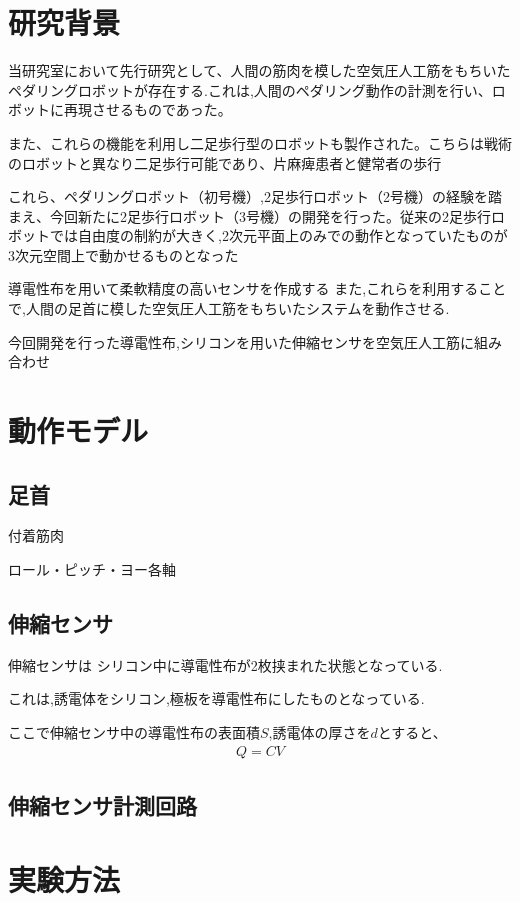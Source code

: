 \section{研究背景}
当研究室において先行研究として、人間の筋肉を模した空気圧人工筋をもちいたペダリングロボットが存在する.これは,人間のペダリング動作の計測を行い、ロボットに再現させるものであった。

また、これらの機能を利用し二足歩行型のロボットも製作された。こちらは戦術のロボットと異なり二足歩行可能であり、片麻痺患者と健常者の歩行

これら、ペダリングロボット（初号機）,2足歩行ロボット（2号機）の経験を踏まえ、今回新たに2足歩行ロボット（3号機）の開発を行った。従来の2足歩行ロボットでは自由度の制約が大きく,2次元平面上のみでの動作となっていたものが3次元空間上で動かせるものとなった

導電性布を用いて柔軟精度の高いセンサを作成する
また,これらを利用することで,人間の足首に模した空気圧人工筋をもちいたシステムを動作させる.

今回開発を行った導電性布,シリコンを用いた伸縮センサを空気圧人工筋に組み合わせ
\section{動作モデル}
\subsection{足首}
付着筋肉

ロール・ピッチ・ヨー各軸
\subsection{伸縮センサ}
伸縮センサは
シリコン中に導電性布が2枚挟まれた状態となっている.

これは,誘電体をシリコン,極板を導電性布にしたものとなっている.

ここで伸縮センサ中の導電性布の表面積$S$,誘電体の厚さを$d$とすると、
\begin{eqnarray}
    Q=CV
\end{eqnarray}
\subsection{伸縮センサ計測回路}
\section{実験方法}
